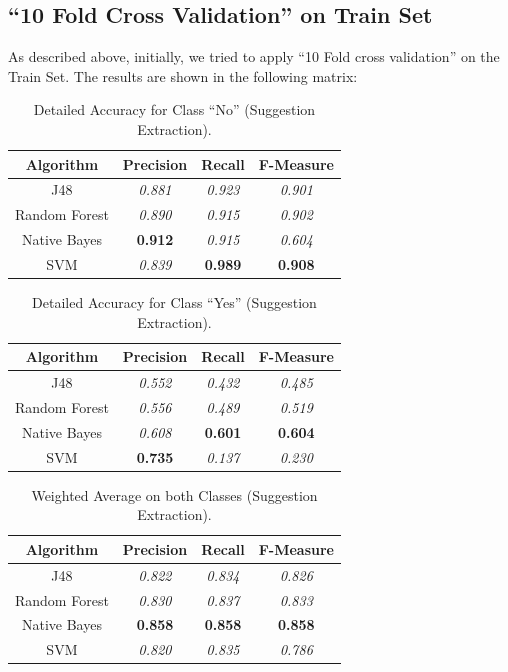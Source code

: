 \subsection{``10 Fold Cross Validation'' on Train Set}\label{421_ref}
As described above, initially, we tried to apply ``10 Fold cross validation'' on the  Train Set. The results are shown in the following matrix:

\begin{table}[H]
\centering
\caption{Detailed Accuracy for Class “No” (Suggestion Extraction).}
\label{45_table_ref}
\begin{tabular}{cccc}
\hline
{\bf Algorithm} & {\bf Precision} & {\bf Recall} & {\bf F-Measure} \\ \hline
J48             & {\it 0.881}     & {\it 0.923}  & {\it 0.901}     \\
Random Forest   & {\it 0.890}      & {\it 0.915}  & {\it 0.902}     \\
Native Bayes    & {\bf 0.912}     & {\it 0.915}  & {\it 0.604}     \\
SVM             & {\it 0.839}     & {\bf 0.989}  & {\bf 0.908}     \\ \hline
\end{tabular}
\end{table}

\begin{table}[H]
\centering
\caption{Detailed Accuracy for Class “Yes” (Suggestion Extraction).}
\label{46_table_ref}
\begin{tabular}{cccc}
\hline
{\bf Algorithm} & {\bf Precision} & {\bf Recall} & {\bf F-Measure} \\ \hline
J48             & {\it 0.552}     & {\it 0.432}  & {\it 0.485}     \\
Random Forest   & {\it 0.556}     & {\it 0.489}  & {\it 0.519}     \\
Native Bayes    & {\it 0.608}     & {\bf 0.601}  & {\bf 0.604}     \\
SVM             & {\bf 0.735}     & {\it 0.137}  & {\it 0.230}     \\ \hline
\end{tabular}
\end{table}

\begin{table}[H]
\centering
\caption{Weighted Average on both Classes (Suggestion Extraction).}
\label{47_table_ref}
\begin{tabular}{cccc}
\hline
{\bf Algorithm} & {\bf Precision} & {\bf Recall} & {\bf F-Measure} \\ \hline
J48             & {\it 0.822}     & {\it 0.834}  & {\it 0.826}     \\
Random Forest   & {\it 0.830}      & {\it 0.837}  & {\it 0.833}     \\
Native Bayes    & {\bf 0.858}     & {\bf 0.858}  & {\bf 0.858}     \\
SVM             & {\it 0.820}      & {\it 0.835}  & {\it 0.786}     \\ \hline
\end{tabular}
\end{table}


